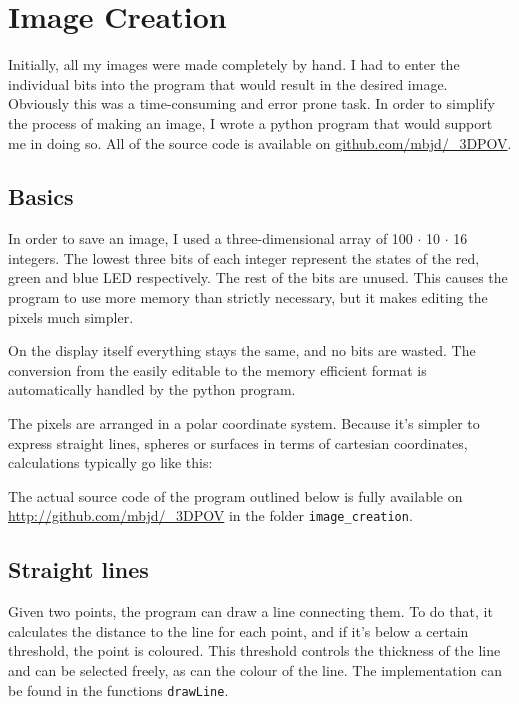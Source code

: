 \documentclass[a4paper, 11pt, titlepage]{report}
\begin{document}
\section{Image Creation}

Initially, all my images were made completely by hand. I had to enter the individual bits into the
program that would result in the desired image. Obviously this was a time-consuming and error
prone task. In order to simplify the process of making an image, I wrote a python program that
would support me in doing so. All of the source code is available on \url{github.com/mbjd/_3DPOV}.

\subsection{Basics}

In order to save an image, I used a three-dimensional array of 100 $\cdot$ 10 $\cdot$ 16 integers.
The lowest three bits of each integer represent the states of the red, green and blue LED
respectively. The rest of the bits are unused. This causes the program to use more memory than
strictly necessary, but it makes editing the pixels much simpler.

On the display itself everything stays the same, and no bits are wasted. The conversion from the
easily editable to the memory efficient format is automatically handled by the python program.

The pixels are arranged in a polar coordinate system. Because it's simpler to express straight
lines, spheres or surfaces in terms of cartesian coordinates, calculations typically go like this:

\begin{algorithm}[H]
\end{algorithm}

The actual source code of the program outlined below is fully available on
\url{http://github.com/mbjd/\_3DPOV} in the folder \texttt{image\_creation}. 

\subsection{Straight lines}

Given two points, the program can draw a line connecting them. To do that, it calculates the
distance to the line for each point, and if it's below a certain threshold, the point is coloured.
This threshold controls the thickness of the line and can be selected freely, as can the colour of
the line. The implementation can be found in the functions \texttt{drawLine}.
\end{document}
